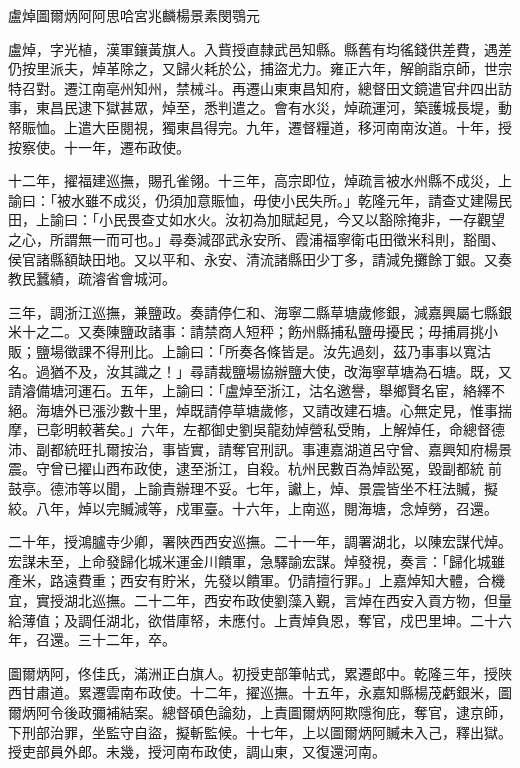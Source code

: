 
\begin{pinyinscope}
盧焯圖爾炳阿阿思哈宮兆麟楊景素閔鶚元

盧焯，字光植，漢軍鑲黃旗人。入貲授直隸武邑知縣。縣舊有均徭錢供差費，遇差仍按里派夫，焯革除之，又歸火耗於公，捕盜尤力。雍正六年，解餉詣京師，世宗特召對。遷江南亳州知州，禁械斗。再遷山東東昌知府，總督田文鏡遣官弁四出訪事，東昌民逮下獄甚眾，焯至，悉判遣之。會有水災，焯疏運河，築護城長堤，動帑賑恤。上遣大臣閱視，獨東昌得完。九年，遷督糧道，移河南南汝道。十年，授按察使。十一年，遷布政使。

十二年，擢福建巡撫，賜孔雀翎。十三年，高宗即位，焯疏言被水州縣不成災，上諭曰：「被水雖不成災，仍須加意賑恤，毋使小民失所。」乾隆元年，請查丈建陽民田，上諭曰：「小民畏查丈如水火。汝初為加賦起見，今又以豁除掩非，一存觀望之心，所謂無一而可也。」尋奏減邵武永安所、霞浦福寧衛屯田徵米科則，豁閩、侯官諸縣額缺田地。又以平和、永安、清流諸縣田少丁多，請減免攤餘丁銀。又奏教民蠶績，疏濬省會城河。

三年，調浙江巡撫，兼鹽政。奏請停仁和、海寧二縣草塘歲修銀，減嘉興屬七縣銀米十之二。又奏陳鹽政諸事：請禁商人短秤；飭州縣捕私鹽毋擾民；毋捕肩挑小販；鹽場徵課不得刑比。上諭曰：「所奏各條皆是。汝先過刻，茲乃事事以寬沽名。過猶不及，汝其識之！」尋請裁鹽場協辦鹽大使，改海寧草塘為石塘。既，又請濬備塘河運石。五年，上諭曰：「盧焯至浙江，沽名邀譽，舉鄉賢名宦，絡繹不絕。海塘外已漲沙數十里，焯既請停草塘歲修，又請改建石塘。心無定見，惟事揣摩，已彰明較著矣。」六年，左都御史劉吳龍劾焯營私受賄，上解焯任，命總督德沛、副都統旺扎爾按治，事皆實，請奪官刑訊。事連嘉湖道呂守曾、嘉興知府楊景震。守曾已擢山西布政使，逮至浙江，自殺。杭州民數百為焯訟冤，毀副都統前鼓亭。德沛等以聞，上諭責辦理不妥。七年，讞上，焯、景震皆坐不枉法贓，擬絞。八年，焯以完贓減等，戍軍臺。十六年，上南巡，閱海塘，念焯勞，召還。

二十年，授鴻臚寺少卿，署陜西西安巡撫。二十一年，調署湖北，以陳宏謀代焯。宏謀未至，上命發歸化城米運金川饋軍，急驛諭宏謀。焯發視，奏言：「歸化城雖產米，路遠費重；西安有貯米，先發以饋軍。仍請擅行罪。」上嘉焯知大體，合機宜，實授湖北巡撫。二十二年，西安布政使劉藻入覲，言焯在西安入貢方物，但量給薄值；及調任湖北，欲借庫帑，未應付。上責焯負恩，奪官，戍巴里坤。二十六年，召還。三十二年，卒。

圖爾炳阿，佟佳氏，滿洲正白旗人。初授吏部筆帖式，累遷郎中。乾隆三年，授陜西甘肅道。累遷雲南布政使。十二年，擢巡撫。十五年，永嘉知縣楊茂虧銀米，圖爾炳阿令後政彌補結案。總督碩色論劾，上責圖爾炳阿欺隱徇庇，奪官，逮京師，下刑部治罪，坐監守自盜，擬斬監候。十七年，上以圖爾炳阿贓未入己，釋出獄。授吏部員外郎。未幾，授河南布政使，調山東，又復還河南。


\end{pinyinscope}
